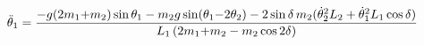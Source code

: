 \documentclass[preview]{standalone}
\begin{document}
\begin{align*}
\special{dvisvgm:raw <g id='unique000'>}\ddot\theta_1 = \frac{-g(2m_1{+}m_2)\sin\theta_1- m_2 g\sin(\theta_1{-}2\theta_2)- 2\sin\delta\, m_2(\dot\theta_2^2 L_2+ \dot\theta_1^2 L_1 \cos\delta)}{L_1\,(2m_1{+}m_2 - m_2\cos 2\delta)}\special{dvisvgm:raw </g>}
\end{align*}
\end{document}
